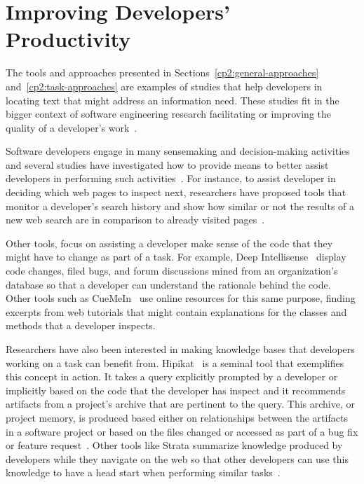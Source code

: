 



\section{Improving Developers' Productivity}
\label{cp2:dev-productivity}



The tools and approaches presented in Sections~\ref{cp2:general-approaches}
and~\ref{cp2:task-approaches}
are examples of studies that help developers in locating 
text that might address an information need.
These studies fit in the bigger context 
of software engineering research 
facilitating or improving the quality of a developer's work~\cite{Kersten2006, Meyer2017, satterfield2020}. 



Software developers engage in many sensemaking and decision-making activities~\cite{sillito2006} and several studies have investigated how to 
provide means to better  
assist developers in performing such activities~\cite{Liu2018Unakite, liu2021, barnett2015}.
For instance, to assist developer in deciding which web pages to inspect next,
researchers have proposed tools that monitor a developer's search history
and show how similar or not the results of a new web search are in comparison to already visited 
pages~\cite{Ponzanelli2017}.



Other tools, focus on assisting a developer make sense of the
code that they might have to change as part of a task. For example, 
Deep Intellisense~\cite{Holmes2008} display code changes, filed bugs, and forum discussions
mined from an organization's database so that a developer can understand the rationale
behind the code.
Other tools such as CueMeIn~\cite{sun2021} use online resources for this same purpose, 
finding excerpts from web tutorials 
that might contain explanations 
for the classes and methods that a developer inspects. 



Researchers have also been interested in 
making knowledge bases
that developers working on a task can benefit from. 
Hipikat~\cite{Cubranic2005} is a seminal tool that exemplifies this concept in action.
It takes a query explicitly prompted by a developer 
or implicitly based on the code that the developer 
has inspect and  
it recommends artifacts from a project's archive 
that are pertinent to the query.
This archive, or project memory, is produced 
based either on relationships between the artifacts in a software project 
or based on the files changed or accessed as part of a bug fix or feature request~\cite{Cubranic2005}.
Other tools like Strata summarize knowledge produced by developers 
while they navigate on the web so that other developers
can use this knowledge to have a 
 head start when performing similar tasks~\cite{liu2021}.


